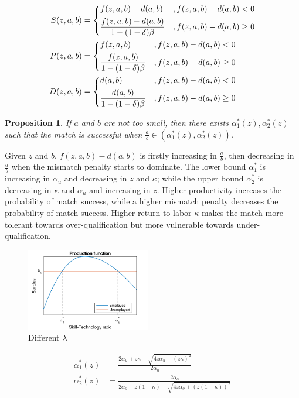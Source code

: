 \documentclass[12pt]{article}
\newtheorem{proposition}{Proposition}
\newcommand{\1}{\mathbb{1}}
\begin{document}
\begin{align*}
S(z,a,b) &= 
\begin{dcases}
f(z,a,b)-d(a,b) &, f(z,a,b)-d(a,b)<0\\
\frac{f(z,a,b)-d(a,b)}{1-(1-\delta)\beta} &,  f(z,a,b)-d(a,b) \geq 0 \\
\end{dcases}\\
P(z,a,b) &= 
\begin{dcases}
f(z,a,b)&, f(z,a,b)-d(a,b)<0\\
\frac{f(z,a,b) }{1-(1-\delta)\beta} &,  f(z,a,b)-d(a,b) \geq 0\\
\end{dcases}\\
D(z,a,b) &= 
\begin{dcases}
d(a,b)&, f(z,a,b)-d(a,b)<0\\
\frac{d(a,b)}{1-(1-\delta)\beta} &,  f(z,a,b)-d(a,b) \geq 0 \\
\end{dcases}
\end{align*}

\begin{proposition}
If $a$ and $b$ are not too small, then there exists $\alpha_1^*(z), \alpha_2^*(z)$ such that the match is successful when $\frac{a}{b}\in(\alpha_1^*(z),\alpha_2^*(z))$. 
\end{proposition}
Given $z$ and $b$, $f(z,a,b)-d(a,b)$ is firstly increasing in $\frac{a}{b}$, then decreasing in $\frac{a}{b}$ when the mismatch penalty starts to dominate. The lower bound $\alpha_1^*$ is increasing in $\alpha_u$ and decreasing in $z$ and $\kappa$; while the upper bound $\alpha_2^*$ is decreasing in $\kappa$ and $\alpha_u$ and increasing in $z$. Higher productivity increases the probability of match success, while a higher mismatch penalty decreases the probability of match success. Higher return to labor $\kappa$ makes the match more tolerant towards over-qualification but more vulnerable towards under-qualification. 
\begin{figure}[h!]
\centering
\includegraphics[width=0.48\textwidth]{Analytical1}
\caption{Different $\lambda$}
\label{Analytical1}
\end{figure}
\begin{align*}
\alpha_1^*(z) &= \frac{2\alpha_u+z\kappa-\sqrt{4z\alpha_u+(z\kappa)^2}}{2\alpha_u} \\
\alpha_2^*(z) &=\frac{2\alpha_o}{2\alpha_o+z(1-\kappa)-\sqrt{4z\alpha_o+(z(1-\kappa))^2}} 
\end{align*}
\end{document}
